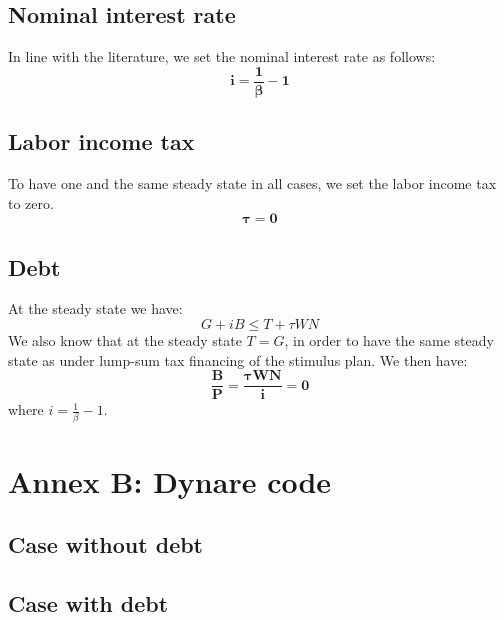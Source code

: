 \documentclass[12pt,letterpaper]{article}
\begin{document}
\subsection*{Nominal interest rate}

In line with the literature, we set the nominal interest rate as follows:
\begin{equation*}
\boldsymbol{i = \frac{1}{\beta} - 1}
\end{equation*}

\subsection*{Labor income tax}

To have one and the same steady state in all cases, we set the labor income tax to zero.
\begin{equation*}
\boldsymbol{\tau = 0}
\end{equation*}

\subsection*{Debt}

At the steady state we have:
\begin{equation*}
G + iB \leq T + \tau WN
\end{equation*}
We also know that at the steady state $T = G$, in order to have the same steady state as under lump-sum tax financing of the stimulus plan. We then have:
\begin{equation*}
\boldsymbol{\frac{B}{P} = \frac{\tau WN}{i} = 0}
\end{equation*}
where $i = \frac{1}{\beta} - 1$.

\newpage
\section*{Annex B: Dynare code}

\subsection*{Case without debt}


\subsection*{Case with debt}

\end{document}
